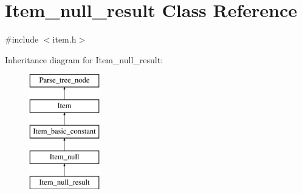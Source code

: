 \hypertarget{classItem__null__result}{}\section{Item\+\_\+null\+\_\+result Class Reference}
\label{classItem__null__result}


{\ttfamily \#include $<$item.\+h$>$}

Inheritance diagram for Item\+\_\+null\+\_\+result\+:\begin{figure}[H]
\begin{center}
\leavevmode
\includegraphics[height=5.000000cm]{classItem__null__result}
\end{center}
\end{figure}
